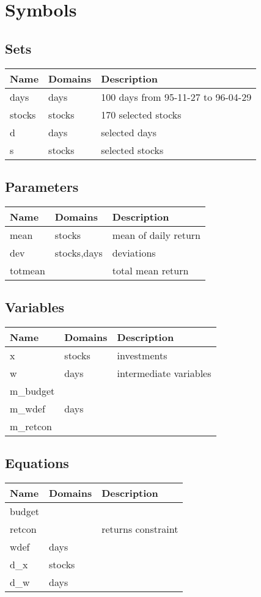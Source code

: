 \documentclass[11pt]{article}
\begin{document}
\section*{Symbols}


\subsection*{Sets}
\begin{tabularx}{\textwidth}{| l | l | X |}
\hline
\textbf{Name} & \textbf{Domains} & \textbf{Description}\\
\hline
\endhead

days & days & 100 days from 95-11-27 to 96-04-29\\
stocks & stocks & 170 selected stocks\\
d & days & selected days\\
s & stocks & selected stocks\\
\hline
\end{tabularx}
\subsection*{Parameters}
\begin{tabularx}{\textwidth}{| l | l | X |}
\hline
\textbf{Name} & \textbf{Domains} & \textbf{Description}\\
\hline
\endhead

mean & stocks & mean of daily return\\
dev & stocks,days & deviations\\
totmean &  & total mean return\\
\hline
\end{tabularx}
\subsection*{Variables}
\begin{tabularx}{\textwidth}{| l | l | X |}
\hline
\textbf{Name} & \textbf{Domains} & \textbf{Description}\\
\hline
\endhead

x & stocks & investments\\
w & days & intermediate variables\\
m\_budget &  & \\
m\_wdef & days & \\
m\_retcon &  & \\
\hline
\end{tabularx}
\subsection*{Equations}
\begin{tabularx}{\textwidth}{| l | l | X |}
\hline
\textbf{Name} & \textbf{Domains} & \textbf{Description}\\
\hline
\endhead

budget &  & \\
retcon &  & returns constraint\\
wdef & days & \\
d\_x & stocks & \\
d\_w & days & \\
\hline
\end{tabularx}
\end{document}
